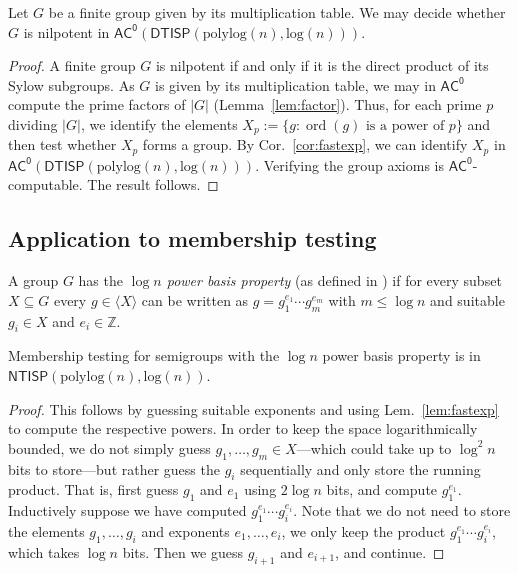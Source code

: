 \documentclass{theoretics}
\newcommand{\ord}[1]{\operatorname{ord}(#1)}
\newcommand{\Z}{\mathbb{Z}}
\newcommand{\Lem}[1]{Lem.~\ref{#1}\xspace}
\newcommand{\Cor}[1]{Cor.~\ref{#1}\xspace}
\newcommand*{\ComplexityClass}[1]{\ensuremath{\mathsf{#1}}\xspace}
\newcommand{\NTISP}{\ComplexityClass{NTISP}}
\newcommand{\DTISP}{\ComplexityClass{DTISP}}
\newcommand{\NTISPpll}{\ensuremath{\NTISP(\mathrm{polylog}(n),\mathrm{log}(n))}\xspace}
\newcommand{\DTISPpll}{\ensuremath{\DTISP(\mathrm{polylog}(n),\mathrm{log}(n))}\xspace}
\newcommand{\ACz}{\ComplexityClass{AC^0}}
\begin{document}
\begin{corollary}
Let $G$ be a finite group given by its multiplication table. We may decide whether $G$ is nilpotent in $\ACz(\DTISPpll)$.        
\end{corollary}

\begin{proof}
A finite group $G$ is nilpotent if and only if it is the direct product of its Sylow subgroups. As $G$ is given by its multiplication table, we may in $\ACz$ compute the prime factors of $|G|$ (Lemma~\ref{lem:factor}).  Thus, for each prime $p$ dividing $|G|$, we identify the elements $X_{p} := \{ g : \ord{g} \text{ is a power of } p \}$ and then test whether $X_{p}$ forms a group. By \Cor{cor:fastexp}, we can identify $X_{p}$ in $\ACz(\DTISPpll)$. Verifying the group axioms is $\ACz$-computable. The result follows.
\end{proof}

\subsection{Application to membership testing}
A group $G$ has the \emph{$\log n$ power basis property} (as defined in \cite{BKLM,Fleischer}) if for every subset $X \subseteq G$ every $g \in \langle X \rangle$ can be written as $g = g_1^{e_1} \cdots g_m^{e_m}$ with $m \leq \log n$ and suitable $g_i \in X$ and $e_i \in \Z$.

\begin{observation} \label{obs:logpowerbasis}
    Membership testing for semigroups with the $\log n$ power basis property is in $\NTISPpll$. 
\end{observation}

\begin{proof}
This follows by guessing suitable exponents and using \Lem{lem:fastexp} to compute the respective powers. In order to keep the space logarithmically bounded, we do not simply guess $g_1, \dotsc, g_m \in X$---which could take up to $\log^2 n$ bits to store---but rather guess the $g_i$ sequentially and only store the running product. That is, first guess $g_1$ and $e_1$ using $2 \log n$ bits, and compute $g_1^{e_1}$. Inductively suppose we have computed $g_1^{e_1} \dotsb g_i^{e_i}$. Note that we do not need to store the elements $g_1, \dotsc, g_i$ and exponents $e_1,\dotsc,e_i$, we only keep the product $g_1^{e_1} \dotsb g_i^{e_i}$, which takes $\log n$ bits. Then we guess $g_{i+1}$ and $e_{i+1}$, and continue.
\end{proof}
\end{document}
